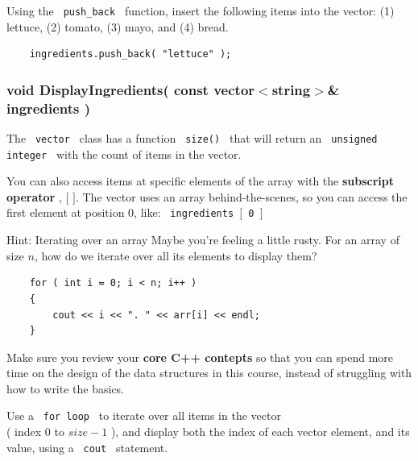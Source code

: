 \documentclass[a4paper,12pt]{book}
\begin{document}
                    Using the \texttt{ push\_back } function, insert the
                    following items into the vector: (1) lettuce,
                    (2) tomato, (3) mayo, and (4) bread.

\begin{verbatim}
    ingredients.push_back( "lettuce" );
\end{verbatim}

                \hrulefill{}
                \subsubsection*{ void DisplayIngredients( const vector$<$string$>$\& ingredients ) }
                    The \texttt{ vector } class has a function \texttt{ size() }
                    that will return an \texttt{ unsigned integer } with
                    the count of items in the vector.

                    You can also access items at specific elements of the
                    array with the \textbf{ subscript operator },
                    $ [ $ $ ] $. The vector uses an array behind-the-scenes,
                    so you can access the first element at position 0, like:
                    \texttt{ ingredients $[$ 0 $]$ } ~\\


                    \begin{hint}{ Hint: Iterating over an array }
                       Maybe you're feeling a little rusty. For an array of size $ n $,
                       how do we iterate over all its elements to display them?

\begin{verbatim}
    for ( int i = 0; i < n; i++ )
    {
        cout << i << ". " << arr[i] << endl;
    }
\end{verbatim}

                        Make sure you review your \textbf{ core C++ contepts }
                        so that you can spend more time on the design of the
                        data structures in this course, instead of struggling
                        with how to write the basics.
                    \end{hint}

                    Use a \texttt{ for loop } to iterate over all items
                    in the vector \\ ( index $ 0 $ to $ size - 1 $ ), and display
                    both the index of each vector element, and its value,
                    using a \texttt{ cout } statement.
\end{document}
